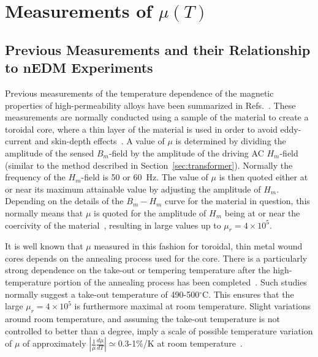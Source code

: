 \documentclass[review,number,sort&compress]{elsarticle}
\begin{document}





\section{Measurements of $\mu(T)$\label{sec:tdep}}

\subsection{Previous Measurements and their Relationship to nEDM Experiments\label{sec:previousmeasurement}}

Previous measurements of the temperature dependence of the magnetic
properties of high-permeability alloys have been summarized in
Refs.~\cite{bib:couderchon,bib:bozorth,bib:pfeifer}.  These
measurements are normally conducted using a sample of the material to
create a toroidal core, where a thin layer of the material is used in
order to avoid eddy-current and skin-depth
effects~\cite{bib:pfeifer,bib:kruppvdm}.  A value of $\mu$ is
determined by dividing the amplitude of the sensed $B_m$-field by the
amplitude of the driving AC $H_m$-field (similar to the method
described in Section~\ref{sec:transformer}).  Normally the frequency
of the $H_m$-field is 50 or 60~Hz.  The value of $\mu$ is then quoted
either at or near its maximum attainable value by adjusting the
amplitude of $H_m$.  Depending on the details of the $B_m-H_m$ curve
for the material in question, this normally means that $\mu$ is quoted
for the amplitude of $H_m$ being at or near the coercivity of the
material~\cite{bib:couderchon,bib:kruppvdm}, resulting in large values
up to $\mu_r=4\times 10^5$.

It is well known that $\mu$ measured in this fashion for toroidal,
thin metal wound cores depends on the annealing process used for the
core.  There is a particularly strong dependence on the take-out or
tempering temperature after the high-temperature portion of the
annealing process has been
completed~\cite{bib:pfeifer,bib:kruppvdm,bib:couderchon}.  Such
studies normally suggest a take-out temperature of 490-500$^\circ$C.
This ensures that the large $\mu_r=4\times 10^{5}$ is furthermore
maximal at room temperature.  Slight variations around room
temperature, and assuming the take-out temperature is not controlled
to better than a degree, imply a scale of possible temperature
variation of $\mu$ of approximately
$\left|\frac{1}{\mu}\frac{d\mu}{dT}\right|\simeq 0.3$-1\%/K at room
temperature~\cite{bib:couderchon,bib:kruppvdm}.
\end{document}
